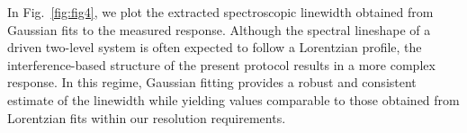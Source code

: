 
  




In Fig.~\ref{fig:fig4}, we plot the extracted spectroscopic linewidth obtained from Gaussian fits to the measured response. Although the spectral lineshape of a driven two-level system is often expected to follow a Lorentzian profile, the interference-based structure of the present protocol results in a more complex response. In this regime, Gaussian fitting provides a robust and consistent estimate of the linewidth while yielding values comparable to those obtained from Lorentzian fits within our resolution requirements.

